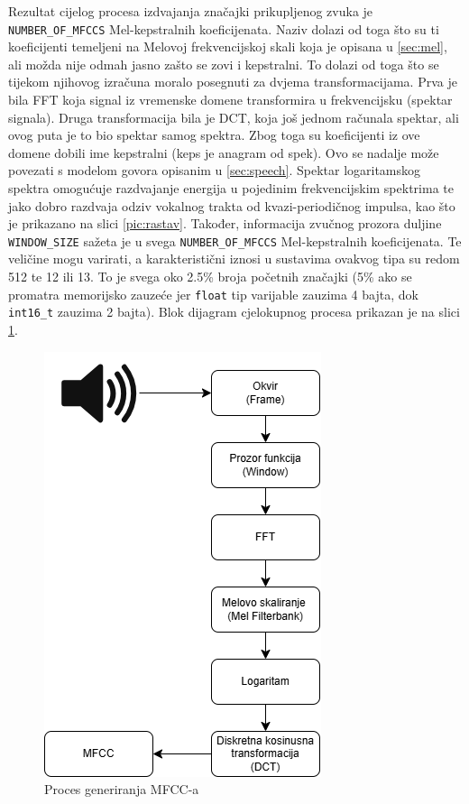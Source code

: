 Rezultat cijelog procesa izdvajanja značajki prikupljenog zvuka je \texttt{NUMBER\_OF\_MFCCS} Mel-kepstralnih
koeficijenata. Naziv dolazi od toga što su ti koeficijenti temeljeni na Melovoj frekvencijskoj
skali koja je opisana u \ref{sec:mel}, ali možda nije odmah jasno zašto se zovi i kepstralni.
To dolazi od toga što se tijekom njihovog izračuna moralo posegnuti za dvjema transformacijama.
Prva je bila FFT koja signal iz vremenske domene transformira u frekvencijsku (spektar
signala). Druga transformacija bila je DCT, koja još jednom računala spektar, ali
ovog puta je to bio spektar samog spektra. Zbog toga su koeficijenti iz ove domene dobili ime
kepstralni (keps je anagram od spek). Ovo se nadalje može povezati s modelom govora opisanim
u \ref{sec:speech}. Spektar logaritamskog spektra omogućuje razdvajanje energija u pojedinim 
frekvencijskim spektrima te jako dobro razdvaja odziv vokalnog trakta od kvazi-periodičnog
impulsa, kao što je prikazano na slici \ref{pic:rastav}. Također, informacija zvučnog
prozora duljine \texttt{WINDOW\_SIZE} sažeta je
u svega \texttt{NUMBER\_OF\_MFCCS} Mel-kepstralnih koeficijenata. Te veličine mogu varirati, a
karakteristični iznosi u sustavima ovakvog tipa su redom 512 te 12 ili 13. To je svega
oko 2.5\% 
broja početnih značajki (5\% ako se promatra memorijsko zauzeće jer \texttt{float} tip varijable
zauzima 4 bajta, dok \texttt{int16\_t} zauzima 2 bajta). Blok dijagram cjelokupnog procesa prikazan
je na slici \ref{pic:generation}.

\begin{figure}[htb]
    \centering
    \includegraphics[width=0.4\linewidth]{Chapters/struktura_sustava/generiranje_znacajki/generation.png} 
    \caption{Proces generiranja MFCC-a \cite{flowchart}}
    \label{pic:generation}
\end{figure}

